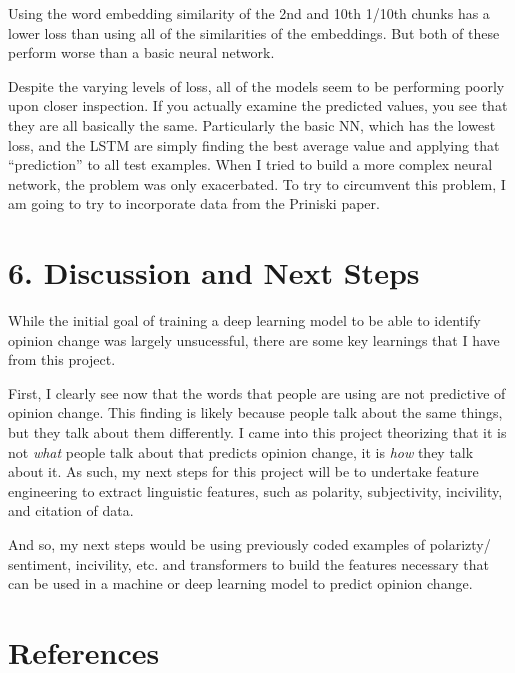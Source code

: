 \documentclass[12pt,]{article}
\begin{document}
Using the word embedding similarity of the 2nd and 10th 1/10th chunks
has a lower loss than using all of the similarities of the embeddings.
But both of these perform worse than a basic neural network.

Despite the varying levels of loss, all of the models seem to be
performing poorly upon closer inspection. If you actually examine the
predicted values, you see that they are all basically the same.
Particularly the basic NN, which has the lowest loss, and the LSTM are
simply finding the best average value and applying that ``prediction''
to all test examples. When I tried to build a more complex neural
network, the problem was only exacerbated. To try to circumvent this
problem, I am going to try to incorporate data from the Priniski paper.

\newpage

\hypertarget{discussion-and-next-steps}{%
\section{6. Discussion and Next Steps}\label{discussion-and-next-steps}}

While the initial goal of training a deep learning model to be able to
identify opinion change was largely unsucessful, there are some key
learnings that I have from this project.

First, I clearly see now that the words that people are using are not
predictive of opinion change. This finding is likely because people talk
about the same things, but they talk about them differently. I came into
this project theorizing that it is not \emph{what} people talk about
that predicts opinion change, it is \emph{how} they talk about it. As
such, my next steps for this project will be to undertake feature
engineering to extract linguistic features, such as polarity,
subjectivity, incivility, and citation of data.

And so, my next steps would be using previously coded examples of
polarizty/ sentiment, incivility, etc. and transformers to build the
features necessary that can be used in a machine or deep learning model
to predict opinion change.

\newpage

\hypertarget{references}{%
\section*{References}\label{references}}
\end{document}
